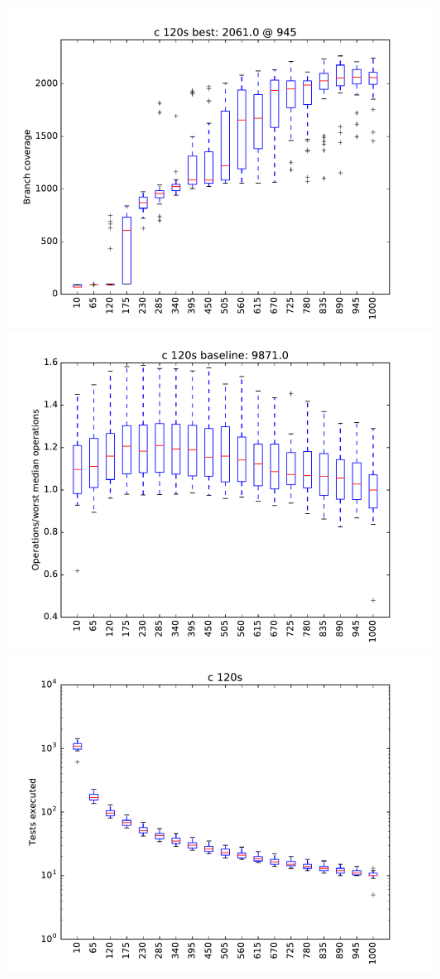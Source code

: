 \begin{figure}
\includegraphics[width=\columnwidth]{graphs/Crand120}
\includegraphics[width=\columnwidth]{graphs/opsCrand120}
\includegraphics[width=\columnwidth]{graphs/execCrand120}
\end{figure}



